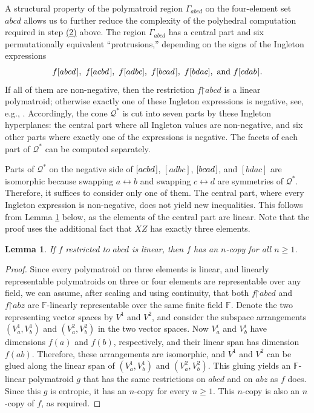 \documentclass[reqno]{amsart}
\newtheorem{lemma}[theorem]{Lemma}
\theoremstyle{definition}
\newcommand\tsp{\mkern 1.5mu}
\def\restr{\mathord\upharpoonright}
\renewcommand\ge{\geqslant}\renewcommand\le{\leqslant}
\def\G#1{\Gamma_{\!#1}}
\def\abcd{[abcd\tsp]}
\def\acbd{[acbd\tsp]}
\def\cdab{[cdab\tsp]}
\newcommand\bref[1]{\hyperlink{#1}{#1}}
\begin{document}
A structural property of the polymatroid region $\G{abcd}$ on the
four-element set $abcd$ allows us to further reduce the complexity of the
polyhedral computation required in step \bref{(2)} above. The region
$\G{abcd}$ has a central part and six permutationally equivalent
``protrusions,'' depending on the signs of the Ingleton expressions
$$
  f\abcd,~ f\acbd,~ f[adbc], ~ f[bcad\tsp], ~f[bdac], \mbox{ and } f\cdab.
$$
If all of them are non-negative, then the restriction $f\restr abcd$ is a
linear polymatroid; otherwise exactly one of these Ingleton expressions is
negative, see, e.g., \cite{Ma.Stud}. Accordingly, the cone $\mathcal Q^*$ is
cut into seven parts by these Ingleton hyperplanes: the central part where
all Ingleton values are non-negative, and six other parts where exactly one
of the expressions is negative. The facets of each part of $\mathcal Q^*$
can be computed separately.

Parts of $\mathcal Q^*$ on the negative side of $\acbd$, $[adbc]$,
$[bcad\tsp]$, and $[bdac]$ are isomorphic because swapping $a\leftrightarrow
b$ and swapping $c\leftrightarrow d$ are symmetries of $\mathcal Q^*$.
Therefore, it suffices to consider only one of them. The central part, where
every Ingleton expression is non-negative, does not yield new inequalities.
This follows from Lemma \ref{lemma:no-linear} below, as the elements of the
central part are linear. Note that the proof uses the additional fact that
$XZ$ has exactly three elements.

\begin{lemma}\label{lemma:no-linear}
If $f$ restricted to $abcd$ is linear, then $f$ has an $n$-copy for all
$n\ge 1$.
\end{lemma}

\begin{proof}
Since every polymatroid on three elements is linear, and linearly
representable polymatroids on three or four elements are representable over
any field, we can assume, after scaling and using continuity, that both
$f\restr abcd$ and $f\restr abz$ are $\mathbb F$-linearly representable over
the same finite field $\mathbb F$. Denote the two representing vector spaces
by $V^1$ and $V^2$, and consider the subspace arrangements $(V^1_a,V^1_b)$
and $(V^2_a,V^2_b)$ in the two vector spaces. Now $V^i_a$ and $V^i_b$ have
dimensions $f(a)$ and $f(b)$, respectively, and their linear span has
dimension $f(ab)$. Therefore, these arrangements are isomorphic, and $V^1$
and $V^2$ can be glued along the linear span of $(V^1_a,V^1_b)$ and
$(V^2_a,V^2_b)$. This gluing yields an $\mathbb F$-linear polymatroid $g$
that has the same restrictions on $abcd$ and on $abz$ as $f$ does. Since
this $g$ is entropic, it has an $n$-copy for every $n\ge 1$. This $n$-copy
is also an $n$-copy of $f$, as required.
\end{proof}
\end{document}
